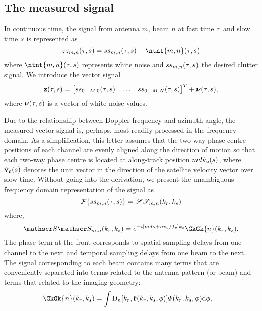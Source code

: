 \documentclass[journal]{IEEEtran}
\newcommand{\prf}{\ensuremath{f_p}}
\newcommand{\phaseSep}{\ensuremath{d}}
\newcommand{\vecsigTime}{\ensuremath{\vct{z}}}
\begin{document}
\subsection{The measured signal}
In continuous time, the signal from antenna $m$, beam $n$ at fast time $\tau$ and slow time $s$ is represented as
\begin{equation}
 \ztzt{m,n}(\fasttime, \parm)=\stst{m,n}(\fasttime, \parm) + \ntnt{m,n}(\fasttime, \parm)
\end{equation}
where $\ntnt{m,n}(\fasttime, \parm)$ represents white noise and $ss_{m,n}(\tau, s)$ the desired clutter signal. We introduce the vector signal
\begin{equation}
 \vecsigTime(\fasttime, \parm) = 
 \begin{bmatrix}
 \stst{0\ldots M, 0}(\fasttime, \parm) &
 \ldots & 
 \stst{0\ldots M, N}(\fasttime, \parm)
 \end{bmatrix}^T
 +
 \boldsymbol{\nu}(\fasttime, \parm),
\end{equation}
where $\boldsymbol{\nu}(\tau, s)$ is a vector of white noise values.
\par
Due to the relationship between Doppler frequency and azimuth angle, the measured vector signal is, perhaps, most readily processed in the frequency domain. As a simplification, this letter assumes that the two-way phase-centre positions of each channel are evenly aligned along the direction of motion so that each two-way phase centre is located at along-track position $m\phaseSep\uSatVelocity{\parm}$, where $\hat{\mathbf{v}}_{\mathbf{c}}(s)$ denotes the unit vector in the direction of the satellite velocity vector over slow-time. Without going into the derivation, we present the unambiguous frequency domain representation of the signal as
\begin{equation}
 \mathcal{F}\{ss_{m,n}(\tau, s)\} = \mathscr{S}\mathscr{S}_{m,n}(k_r, k_{s})
\end{equation}
where,
\begin{equation}
 \SkSk{m,n}(\kveczero) = \eex{-\im [m\phaseSep\kappa+n\effrelvel/\prf]\kparm}\GkGk{n}(\kveczero).
 \label{eq:signalModel}
\end{equation}
The phase term at the front corresponds to spatial sampling delays from one channel to the next and temporal sampling delays from one beam to the next. The signal corresponding to each beam contains many terms that are conveniently separated into terms related to the antenna pattern (or beam) and terms that related to the imaging geometry:
\begin{equation}
\begin{split}
 &\GkGk{n}(\kveczero) = \int\dPattern{n}[\kr,\uRangeVector{\kveczero, \targetdepression}]\vkern(\kr,\kparm,\depression)\d\depression,
 \end{split}
 \label{eq:stripSAR3d}
\end{equation}
\end{document}
